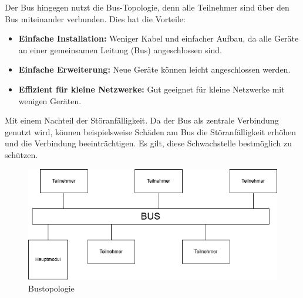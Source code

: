  Der Bus hingegen nutzt die Bus-Topologie, denn alle Teilnehmer sind über den Bus miteinander verbunden. Dies hat die Vorteile:
\begin{itemize}
    \item\textbf{Einfache Installation:} Weniger Kabel und einfacher Aufbau, da alle Geräte an einer gemeinsamen Leitung (Bus) angeschlossen sind.
    \item\textbf{Einfache Erweiterung:} Neue Geräte können leicht angeschlossen werden. 
    \item\textbf{Effizient für kleine Netzwerke:} Gut geeignet für kleine Netzwerke mit wenigen Geräten. 
\end{itemize}
Mit einem Nachteil der Störanfälligkeit. Da der Bus als zentrale Verbindung genutzt wird, können beispielsweise Schäden am Bus die Störanfälligkeit erhöhen und die Verbindung beeinträchtigen. Es gilt, diese Schwachstelle bestmöglich zu schützen.\\
\begin{figure}[H]
	\centering    
	\includegraphics[width=1\textwidth]{Bilder/bustopologie.png}
	\caption{Bustopologie}
	\label{Bustopologie}
\end{figure}


